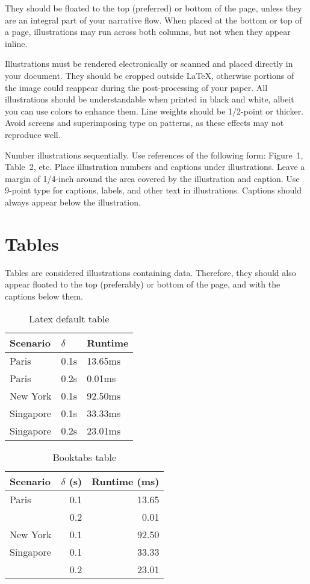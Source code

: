 \documentclass{article}
\begin{document}
They should be floated to the top (preferred) or bottom of the page, unless
they are an integral part of your narrative flow. When placed at the bottom or
top of a page, illustrations may run across both columns, but not when they
appear inline.

Illustrations must be rendered electronically or scanned and placed directly in
your document. They should be cropped outside \LaTeX{}, otherwise portions of the
image could reappear during the post-processing of your paper. All
illustrations should be understandable when printed in black and white, albeit
you can use colors to enhance them. Line weights should be 1/2-point or
thicker. Avoid screens and superimposing type on patterns, as these effects may
not reproduce well.

Number illustrations sequentially. Use references of the following
form: Figure~1, Table~2, etc. Place illustration numbers and captions
under illustrations. Leave a margin of 1/4-inch around the area
covered by the illustration and caption.  Use 9-point type for
captions, labels, and other text in illustrations. Captions should always appear below the illustration.

\section{Tables}

Tables are considered illustrations containing data. Therefore, they should also appear floated to the top (preferably) or bottom of the page, and with the captions below them.

\begin{table}
\centering
\begin{tabular}{lll}
\hline
Scenario  & $\delta$ & Runtime \\
\hline
Paris       & 0.1s  & 13.65ms     \\
Paris       & 0.2s  & 0.01ms      \\
New York    & 0.1s  & 92.50ms     \\
Singapore   & 0.1s  & 33.33ms     \\
Singapore   & 0.2s  & 23.01ms     \\
\hline
\end{tabular}
\caption{Latex default table}
\label{tab:plain}
\end{table}

\begin{table}
\centering
\begin{tabular}{lrr}
\toprule
Scenario  & $\delta$ (s) & Runtime (ms) \\
\midrule
Paris       & 0.1  & 13.65      \\
            & 0.2  & 0.01       \\
New York    & 0.1  & 92.50      \\
Singapore   & 0.1  & 33.33      \\
            & 0.2  & 23.01      \\
\bottomrule
\end{tabular}
\caption{Booktabs table}
\label{tab:booktabs}
\end{table}
\end{document}
